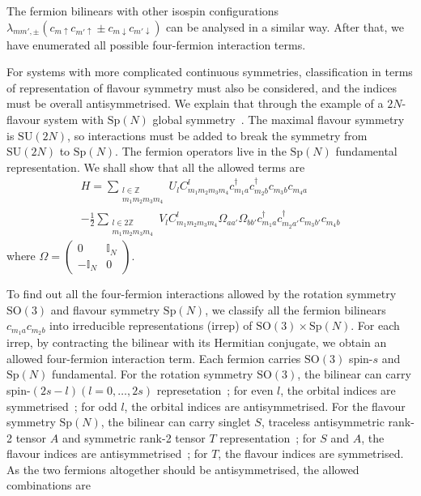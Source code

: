 \documentclass{timesjhep}
\begin{document}
The fermion bilinears with other isospin configurations $\lambda_{mm',\pm}(c_{m\uparrow}c_{m'\uparrow}\pm c_{m\downarrow}c_{m'\downarrow})$ can be analysed in a similar way. After that, we have enumerated all possible four-fermion interaction terms. 

For systems with more complicated continuous symmetries, classification in terms of representation of flavour symmetry must also be considered, and the indices must be overall antisymmetrised. We explain that through the example of a $2N$-flavour system with $\mathrm{Sp}(N)$ global symmetry~\cite{Zhou2024Oct}. The maximal flavour symmetry is $\mathrm{SU}(2N)$, so interactions must be added to break the symmetry from $\mathrm{SU}(2N)$ to $\mathrm{Sp}(N)$. The fermion operators live in the $\mathrm{Sp}(N)$ fundamental representation. We shall show that all the allowed terms are 
\begin{multline}
    H=\sum_{\substack{l\in\mathbb{Z}\\m_1m_2m_3m_4}}U_lC^l_{m_1m_2m_3m_4}c^\dagger_{m_1a}c^\dagger_{m_2b}c_{m_3b}c_{m_4a}\\
    -\frac{1}{2}\sum_{\substack{l\in 2\mathbb{Z}\\m_1m_2m_3m_4}}V_lC^l_{m_1m_2m_3m_4}\Omega_{aa'}\Omega_{bb'}c^\dagger_{m_1a}c^\dagger_{m_2a'}c_{m_3b'}c_{m_4b} 
\end{multline} 
where $\Omega=\begin{pmatrix}0&\mathbb{I}_N\\-\mathbb{I}_N&0\end{pmatrix}$. 

To find out all the four-fermion interactions allowed by the rotation symmetry $\mathrm{SO}(3)$ and flavour symmetry $\mathrm{Sp}(N)$, we classify all the fermion bilinears $c_{m_1a}c_{m_2b}$ into irreducible representations (irrep) of $\mathrm{SO}(3)\times\mathrm{Sp}(N)$. For each irrep, by contracting the bilinear with its Hermitian conjugate, we obtain an allowed four-fermion interaction term. Each fermion carries $\mathrm{SO}(3)$ spin-$s$ and $\mathrm{Sp}(N)$ fundamental. For the rotation symmetry $\mathrm{SO}(3)$, the bilinear can carry spin-$(2s-l)(l=0,\dots,2s)$ represetation~; for even $l$, the orbital indices are symmetrised~; for odd $l$, the orbital indices are antisymmetrised. For the flavour symmetry $\mathrm{Sp}(N)$, the bilinear can carry singlet $S$, traceless antisymmetric rank-2 tensor $A$ and symmetric rank-2 tensor $T$ representation~; for $S$ and $A$, the flavour indices are antisymmetrised~; for $T$, the flavour indices are symmetrised. As the two fermions altogether should be antisymmetrised, the allowed combinations are 
\end{document}
